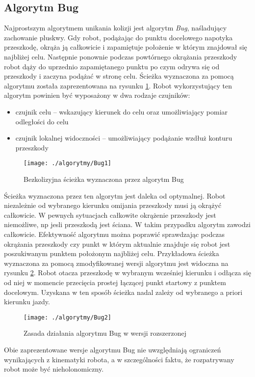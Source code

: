 \subsection{Algorytm Bug}
	Najprostszym algorytmem unikania kolizji jest algorytm \emph{Bug}, naśladujący zachowanie pluskwy. Gdy robot,
	podążając do punktu docelowego napotyka przeszkodę, okrąża ją całkowicie i zapamiętuje położenie w którym
	znajdował się najbliżej celu. Następnie ponownie podczas powtórnego okrążania przeszkody robot dąży do
	uprzednio zapamiętanego punktu po czym odrywa się od przeszkody i zaczyna podążać w stronę celu. Ścieżka
	wyznaczona za pomocą algorytmu została zaprezentowana na rysunku
	\ref{fig:Bug1}. Robot wykorzystujący ten algorytm powinien być wyposażony w dwa rodzaje czujników:
	\begin{itemize}
	\item czujnik celu -- wskazujący kierunek do celu oraz umożliwiający pomiar odległości do celu
	\item czujnik lokalnej widoczności -- umożliwiający  podążanie wzdłuż konturu przeszkody 
	\end{itemize}
	\begin{figure}[h]
	\centering
	\texttt{[image: ./algorytmy/Bug1]}
	\caption{ Bezkolizyjna ścieżka wyznaczona przez algorytm Bug }\label{fig:Bug1}
	\end{figure}
	Ścieżka wyznaczona przez ten algorytm jest daleka od optymalnej. Robot niezależnie od wybranego kierunku
	omijania przeszkody musi ją okrążyć całkowicie. W pewnych sytuacjach całkowite okrążenie przeszkody jest niemożliwe, np jesli przeszkodą jest ściana. W takim przypadku algorytm zawodzi całkowicie.
	Efektywność algorytmu można poprawić sprawdzając podczas okrążania przeszkody czy punkt w którym aktualnie
	znajduje  się robot jest poszukiwanym punktem położonym najbliżej celu. Przykładowa ścieżka
	wyznaczona za pomocą zmodyfikowanej wersji algorytmu jest widoczna na rysunku \ref{fig:Bug2}.
	Robot otacza przeszkodę w wybranym wcześniej kierunku i odłącza się od niej w momencie przecięcia
 	prostej łączącej punkt startowy z punktem docelowym. Uzyskana w ten sposób ścieżka nadal zależy od wybranego
	 a priori kierunku jazdy.	
	\begin{figure}
	\centering
	\texttt{[image: ./algorytmy/Bug2]}
	\caption{Zasada działania algorytmu Bug w wersji rozszerzonej}\label{fig:Bug2}
	\end{figure}
	Obie zaprezentowane wersje algorytmu Bug nie uwzględniają ograniczeń wynikających z kinematyki robota, a w
	szczególności faktu, że rozpatrywany robot może być nieholonomiczny.
